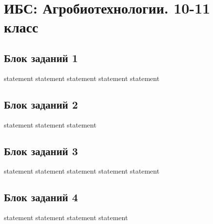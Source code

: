 \chapter{ИБС: Агробиотехнологии. 10-11 класс}

\section{Блок заданий 1}

{statement}
{statement}
{statement}
{statement}
{statement}

\section{Блок заданий 2}

{statement}
{statement}
{statement}

\section{Блок заданий 3}

{statement}
{statement}
{statement}
{statement}
{statement}

\section{Блок заданий 4}

{statement}
{statement}
{statement}
{statement}